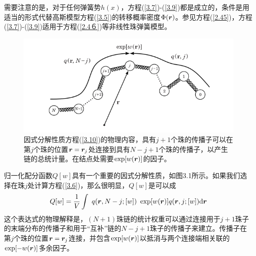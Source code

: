 需要注意的是，对于任何弹簧势$h(x)$，方程(\ref{3.7})-(\ref{3.9})都是成立的，条件是用适当的形式代替高斯模型方程(\ref{3.5})的转移概率密度$\Phi(\bm{r})$。参见方程(\ref{2.45})，方程(\ref{3.7})-(\ref{3.9})适用于方程(\ref{2.4６})等非线性珠弹簧模型。
\begin{figure}[H]
\centering
\includegraphics[scale=0.7]{Contents/chapter3/figures/Figure_1.png}
\caption{因式分解性质方程(\ref{3.10})的物理内容，具有$j+1$个珠的传播子可以在第$j$个珠的位置$\bm{r}=\bm{r}_j$处连接到具有$N-j+1$个珠的传播子，以产生链的总统计量。在结点处需要$\exp[w(\bm{r})]$的因子。}
\end{figure}
归一化配分函数$Q[w]$具有一个重要的因式分解性质，如图3.1所示。如果我们选择在珠$j$处计算方程(\ref{3.6})，那么很明显，$Q[w]$是可以成
\begin{equation}\label{3.10}
Q[w]=\frac{1}{V}\int~q(\bm{r},N-j;[w])~\exp[w(\bm{r})]q(\bm{r},j;[w])\mathrm{d}\bm{r}
\end{equation}
这个表达式的物理解释是，$(N+1)$珠链的统计权重可以通过连接用于$j+1$珠子的末端分布的传播子和用于“互补”链的$N-j+1$珠子的传播子来建立。传播子在第$j$个珠的位置$\bm{r}=\bm{r}_j$连接，并包含$\exp[w(\bm{r})]$以抵消与两个连接端相关联的$\exp[-w(\bm{r})]$多余因子。

